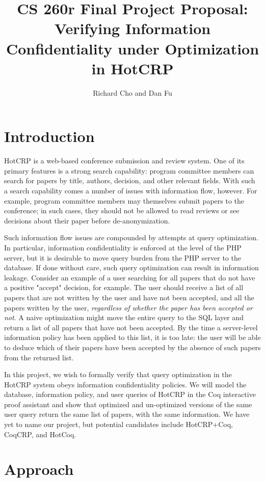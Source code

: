 \documentclass[11pt,journal]{IEEEtran}
\title{CS 260r Final Project Proposal: Verifying Information Confidentiality under Optimization in HotCRP}
\author{Richard Cho and Dan Fu}
\begin{document}
\maketitle

\section{Introduction}
HotCRP is a web-based conference submission and review system\cite{hotcrp, hotcrppaper}.  One of its primary features is a strong search capability: program committee members can search for papers by title, authors, decision, and other relevant fields.  With such a search capability comes a number of issues with information flow, however.  For example, program committee members may themselves submit papers to the conference; in such cases, they should not be allowed to read reviews or see decisions about their paper before de-anonymization.

Such information flow issues are compounded by attempts at query optimization.  In particular, information confidentiality is enforced at the level of the PHP server, but it is desirable to move query burden from the PHP server to the database.  If done without care, such query optimization can result in information leakage.  Consider an example of a user searching for all papers that do not have a positive "accept" decision, for example.  The user should receive a list of all papers that are not written by the user and have not been accepted, and all the papers written by the user, \textit{regardless of whether the paper has been accepted or not}.  A naive optimization might move the entire query to the SQL layer and return a list of all papers that have not been accepted.  By the time a server-level information policy has been applied to this list, it is too late: the user will be able to deduce which of their papers have been accepted by the absence of such papers from the returned list.

In this project, we wish to formally verify that query optimization in the HotCRP system obeys information confidentiality policies.  We will model the database, information policy, and user queries of HotCRP in the Coq interactive proof assistant\cite{coq} and show that optimized and un-optimized versions of the same user query return the same list of papers, with the same information.  We have yet to name our project, but potential candidates include HotCRP+Coq, CoqCRP, and HotCoq.

\section{Approach}
\end{document}

